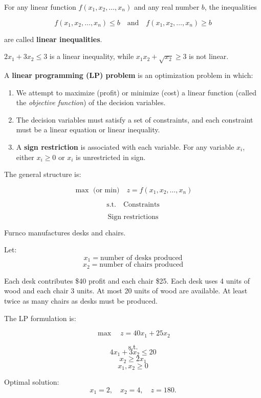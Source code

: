 \documentclass[12pt]{article}
\begin{document}
\begin{definition}
For any linear function $f(x_1,x_2,\ldots,x_n)$ and any real number $b$,
the inequalities

\[
f(x_1,x_2,\ldots,x_n)\le b
\quad \text{and} \quad
f(x_1,x_2,\ldots,x_n)\ge b
\]

are called \textbf{linear inequalities}.
\end{definition}

\begin{example}
$2x_1+3x_2\le 3$ is a linear inequality, while 
$x_1x_2+\sqrt{x_2}\ge 3$ is not linear.
\end{example}

\begin{definition}
A \textbf{linear programming (LP) problem} is an optimization problem in which:

\begin{enumerate}
\item We attempt to maximize (profit) or minimize (cost) a linear function
(called the \textit{objective function}) of the decision variables.

\item The decision variables must satisfy a set of constraints, and each
constraint must be a linear equation or linear inequality.

\item A \textbf{sign restriction} is associated with each variable.
For any variable $x_i$, either $x_i \ge 0$ or $x_i$ is unrestricted in sign.
\end{enumerate}

The general structure is:

\[
\max \text{ (or min)} \quad z=f(x_1,x_2,\ldots,x_n)
\]

\[
\text{s.t.} \quad \text{Constraints}
\]

\[
\text{Sign restrictions}
\]
\end{definition}


\begin{example}[Example 1.3]
Furnco manufactures desks and chairs.

Let:
\[
x_1 = \text{number of desks produced}
\]
\[
x_2 = \text{number of chairs produced}
\]

Each desk contributes \$40 profit and each chair \$25.
Each desk uses 4 units of wood and each chair 3 units.
At most 20 units of wood are available.
At least twice as many chairs as desks must be produced.

The LP formulation is:

\[
\max \quad z = 40x_1 + 25x_2
\]

\[
\text{s.t.}
\]
\[
4x_1 + 3x_2 \le 20
\]
\[
x_2 \ge 2x_1
\]
\[
x_1,x_2 \ge 0
\]

Optimal solution:
\[
x_1=2,\quad x_2=4,\quad z=180.
\]
\end{example}
\end{document}
